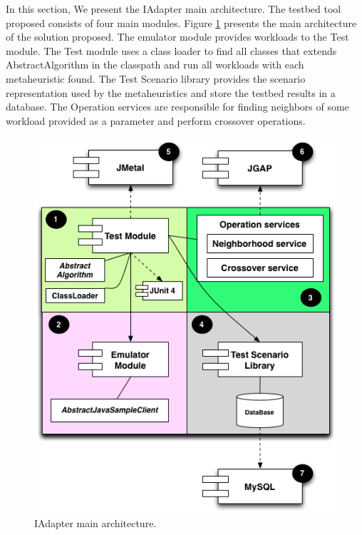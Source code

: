 \documentclass{report}
\begin{document}
In this section, We present the IAdapter main architecture. The testbed tool proposed consists of four main modules.  Figure \ref{fig:testbedarch} presents the main architecture of the solution proposed. The emulator module provides workloads to the Test module. The Test module uses a class loader to find all classes that extends AbstractAlgorithm in the classpath and run all workloads with each metaheuristic found. The Test Scenario library provides the scenario representation used by the metaheuristics and store the testbed results in a database. The Operation services are responsible for finding neighbors of some workload provided as a parameter and perform crossover operations.

\begin{figure}[h]
\begin{minipage}{.5\textwidth}
\centering
\includegraphics[width=1\textwidth]{./images/testbedarch.png}
\caption{IAdapter main architecture.}
\label{fig:testbedarch}
\end{minipage}
\begin{minipage}{.5\textwidth}

\end{minipage}
\end{figure}
\end{document}

